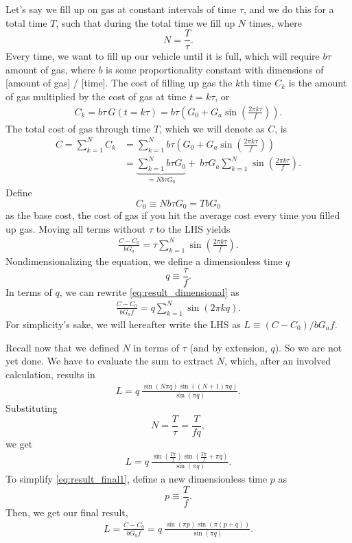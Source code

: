 \documentclass[11pt]{article}
\begin{document}
\par Let's say we fill up on gas at constant intervals of time $\tau$, and we do this for a total time $T$, such that during the total time we fill up $N$ times, where
 $$N = \frac{T}{\tau}.$$ 
Every time, we want to fill up our vehicle until it is full, which will require $b \tau$ amount of gas, where $b$ is some proportionality constant with dimensions of [amount of gas] / [time]. The cost of filling up gas the $k$th time $C_k$ is the amount of gas multiplied by the cost of gas at time $t = k \tau$, or
\begin{align}
C_k = b\tau \, G(t = k \tau) = b\tau \left( G_0 + G_a \sin \left( \frac{2 \pi k \tau}{f}\right) \right).
\end{align}
The total cost of gas through time $T$, which we will denote as $C$, is
\begin{align}
C = \sum_{k=1}^{N}{C_k} &= \sum_{k=1}^{N}{ b\tau \left( G_0 + G_a \sin \left( \frac{2 \pi k \tau}{f}\right) \right)} \nonumber \\ 
 &= \underbrace{\sum_{k=1}^{N}{ b\tau G_0}}_{=Nb \tau G_0} + \: b \tau G_a \sum_{k=1}^{N} \sin \left( \frac{2 \pi k \tau}{f}\right). \label{eq:sum_C_k}
\end{align}
Define 
$$
C_0 \equiv Nb\tau G_0 = TbG_0
$$
 as the base cost, the cost of gas if you hit the average cost every time you filled up gas. Moving all terms without $\tau$ to the LHS yields
\begin{align}
\frac{C - C_0}{b G_a} = \tau \sum_{k=1}^{N}{\sin \left( \frac{2 \pi k \tau}{f}\right)} \label{eq:result_dimensional}.
\end{align}
Nondimensionalizing the equation, we define a dimensionless time $q$
$$
q \equiv \frac{\tau}{f}.
$$ 
In terms of $q$, we can rewrite \eqref{eq:result_dimensional} as
\begin{align}
\frac{C - C_0}{b G_a f} = q \sum_{k=1}^{N}{\sin \left( 2 \pi k q\right)}. \label{eq:result_dimensionless}
\end{align}
For simplicity's sake, we will hereafter write the LHS as $L \equiv (C - C_0) / b G_a f$.

\par
Recall now that we defined $N$ in terms of $\tau$ (and by extension, $q$). So we are not yet done. We have to evaluate the sum to extract $N$, which, after an involved calculation, results in
\begin{align}
L = q \: \frac{\sin(N\pi q) \sin((N+1)\pi q)}{\sin(\pi q)}.
\end{align}
Substituting 
$$
N = \frac{T}{\tau} = \frac{T}{fq},
$$
we get
\begin{align}
L = q \: \frac{\sin\left(\frac{T \pi}{f}\right) \sin\left(\frac{T \pi}{f} + \pi q\right)}{\sin(\pi q)}. \label{eq:result_final1}
\end{align}
To simplify \eqref{eq:result_final1}, define a new dimensionless time $p$ as 
$$
p \equiv \frac{T}{f}.
$$ 
Then, we get our final result,
\begin{align}
\boxed{L = \frac{C - C_0}{b G_a f} = q \: \frac{\sin(\pi p) \sin(\pi (p+q))}{\sin(\pi q)}}. \label{eq:result_final2}
\end{align}
\end{document}
